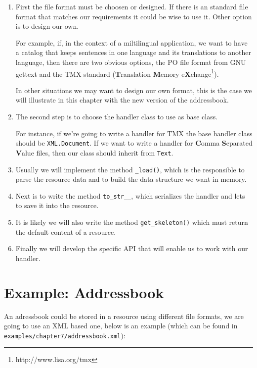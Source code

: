 \begin{enumerate}
  \item First the file format must be choosen or designed. If there is an
    standard file format that matches our requirements it could be wise to
    use it. Other option is to design our own.

    For example, if, in the context of a miltilingual application, we want
    to have a catalog that keeps sentences in one language and its
    translations to another language, then there are two obvious options,
    the PO file format from GNU gettext and the TMX standard ({\bf T}ranslation
    {\bf M}emory e{\bf X}change\footnote{http://www.lisa.org/tmx}).

    In other situations we may want to design our own format, this is the
    case we will illustrate in this chapter with the new version of
    the addressbook.

  \item The second step is to choose the handler class to use as base class.

    For instance, if we're going to write a handler for TMX the base handler
    class should be {\tt XML.Document}. If we want to write a handler for
    {\bf C}omma {\bf S}eparated {\bf V}alue files, then our class should
    inherit from {\tt Text}.

  \item Usually we will implement the method {\tt \_load()}, which is the
    responsible to parse the resource data and to build the data structure
    we want in memory.

  \item Next is to write the method {\tt to\_str\_\_}, which serializes the
    handler and lets to save it into the resource.

  \item It is likely we will also write the method {\tt get\_skeleton()}
    which must return the default content of a resource.

  \item Finally we will develop the specific API that will enable us to
    work with our handler.
\end{enumerate}

\section{Example: Addressbook}

An adressbook could be stored in a resource using different file formats,
we are going to use an XML based one, below is an example (which can be
found in {\tt examples/chapter7/addressbook.xml}):

